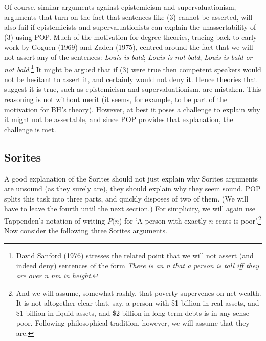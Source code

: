 Of course, similar arguments against epistemicism and supervaluationism, arguments that turn on the fact that sentences like (3) cannot be asserted, will also fail if epistemicists and supervaluationists can explain the unassertability of (3) using POP. Much of the motivation for degree theories, tracing back to early work by Goguen (1969) and Zadeh (1975), centred around the fact that we will not assert any of the sentences: \textit{Louis is bald}; \textit{Louis is not bald}; \textit{Louis is bald or not bald}.\footnote{David Sanford (1976) stresses the related point that we will not assert (and indeed deny) sentences of the form \textit{There is an n that a person is tall iff they are over n nm in height}.} It might be argued that if (3) were true then competent speakers would not be hesitant to assert it, and certainly would not deny it. Hence theories that suggest it is true, such as epistemicism and supervaluationism, are mistaken. This reasoning is not without merit (it seems, for example, to be part of the motivation for BH's theory). However, at best it poses a challenge to explain why it might not be assertable, and since POP provides that explanation, the challenge is met.

\subsection{Sorites}

A good explanation of the Sorites should not just explain why Sorites arguments are unsound (as they surely are), they should explain why they seem sound. POP splits this task into three parts, and quickly disposes of two of them. (We will have to leave the fourth until the next section.) For simplicity, we will again use Tappenden's notation of writing \(P(n\)) for `A person with exactly \(n\) cents is poor'.\footnote{And we will assume, somewhat rashly, that poverty supervenes on net wealth. It is not altogether clear that, say, a person with \$1 billion in real assets, and \$1 billion in liquid assets, and \$2 billion in long-term debts is in any sense poor. Following philosophical tradition, however, we will assume that they are.} Now consider the following three Sorites arguments.

